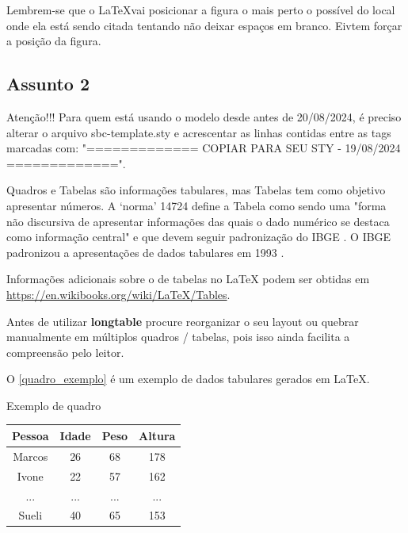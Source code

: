 \documentclass[
	article,			%
	12pt,				%
	oneside,			%
	a4paper,			%
    BIBLATEX,           %
	english,			%
	brazil,				%
	sumario=tradicional
	]{abntex2}
\begin{document}
Lembrem-se que o \LaTeX vai posicionar a figura o mais perto o possível do local onde ela está sendo citada tentando não deixar espaços em branco. Eivtem forçar a posição da figura.


\subsection{Assunto 2}

Atenção!!! Para quem está usando o modelo desde antes de 20/08/2024, é preciso
alterar o arquivo sbc-template.sty e acrescentar as linhas contidas entre as tags marcadas com: "============= COPIAR PARA SEU STY - 19/08/2024 =============".

Quadros e Tabelas são informações tabulares, mas Tabelas tem como objetivo apresentar números. A ‘norma’ 14724 \cite{NBR14724:2011} define a Tabela como sendo uma "forma não discursiva de apresentar informações das quais o dado numérico se destaca como informação central" e que devem seguir padronização do IBGE \cite{NBR14724:2011}. O IBGE padronizou a apresentações de dados tabulares em 1993 \cite{tabular-ibge}.

Informações adicionais sobre o de tabelas no {\LaTeX} podem ser obtidas em  \url{https://en.wikibooks.org/wiki/LaTeX/Tables}.

Antes de utilizar \textbf{longtable} procure reorganizar o seu layout ou quebrar manualmente em múltiplos quadros / tabelas, pois isso ainda facilita a compreensão pelo leitor.


O \autoref{quadro_exemplo} é um exemplo de dados tabulares gerados em \LaTeX.

\begin{quadro}[htb]
\caption{\label{quadro_exemplo}Exemplo de quadro}
\begin{tabular}{|c|c|c|c|}
	\hline
	\textbf{Pessoa} & \textbf{Idade} & \textbf{Peso} & \textbf{Altura} \\ \hline
	Marcos & 26    & 68   & 178    \\ \hline
	Ivone  & 22    & 57   & 162    \\ \hline
	...    & ...   & ...  & ...    \\ \hline
	Sueli  & 40    & 65   & 153    \\ \hline
\end{tabular}
\end{quadro}
\end{document}
